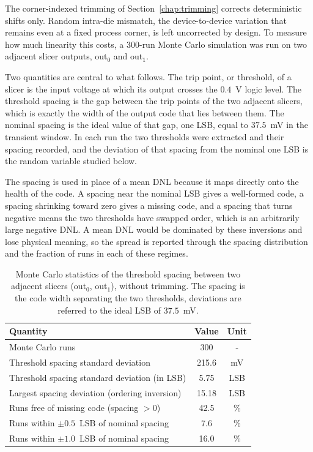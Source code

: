 The corner-indexed trimming of Section~\ref{chap:trimming} corrects deterministic shifts only. Random intra-die mismatch, the device-to-device variation that remains even at a fixed process corner, is left uncorrected by design. To measure how much linearity this costs, a 300-run Monte Carlo simulation was run on two adjacent slicer outputs, out$_0$ and out$_1$.

Two quantities are central to what follows. The trip point, or threshold, of a slicer is the input voltage at which its output crosses the $0.4$~V logic level. The threshold spacing is the gap between the trip points of the two adjacent slicers, which is exactly the width of the output code that lies between them. The nominal spacing is the ideal value of that gap, one LSB, equal to $37.5$~mV in the transient window. In each run the two thresholds were extracted and their spacing recorded, and the deviation of that spacing from the nominal one LSB is the random variable studied below.

The spacing is used in place of a mean DNL because it maps directly onto the health of the code. A spacing near the nominal LSB gives a well-formed code, a spacing shrinking toward zero gives a missing code, and a spacing that turns negative means the two thresholds have swapped order, which is an arbitrarily large negative DNL. A mean DNL would be dominated by these inversions and lose physical meaning, so the spread is reported through the spacing distribution and the fraction of runs in each of these regimes.

\begin{table}[htbp]
    \centering
    \caption{Monte Carlo statistics of the threshold spacing between two adjacent slicers (out$_0$, out$_1$), without trimming. The spacing is the code width separating the two thresholds, deviations are referred to the ideal LSB of $37.5$~mV.}
    \label{tab:mc_mismatch}
    \renewcommand{\arraystretch}{1.3}
    \begin{tabular}{lcc}
        \toprule
        \textbf{Quantity} & \textbf{Value} & \textbf{Unit} \\
        \midrule
        Monte Carlo runs                                  & 300       & -   \\
        Threshold spacing standard deviation              & 215.6     & mV   \\
        Threshold spacing standard deviation (in LSB)      & 5.75      & LSB  \\
        Largest spacing deviation (ordering inversion)    & 15.18     & LSB  \\
        Runs free of missing code (spacing $> 0$)         & 42.5      & \%   \\
        Runs within $\pm 0.5$~LSB of nominal spacing      & 7.6       & \%   \\
        Runs within $\pm 1.0$~LSB of nominal spacing      & 16.0      & \%   \\
        \bottomrule
    \end{tabular}
\end{table}

